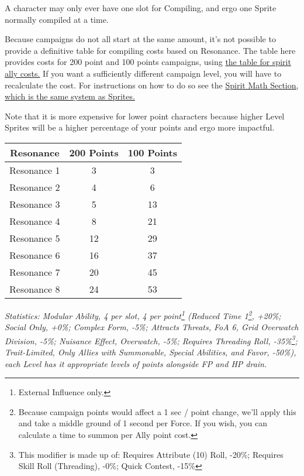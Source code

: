 \begin{multicols*}{3}
	A character may only ever have one slot for Compiling, and ergo one Sprite normally compiled at a time.
	
	Because campaigns do not all start at the same amount, it's not possible to provide a definitive table for compiling costs based on Resonance. The table here provides costs for 200 point and 100 points campaigns, using \hyperref[sprite_ally_cost]{the table for spirit ally costs.} If you want a sufficiently different campaign level, you will have to recalculate the cost. For instructions on how to do so see the \hyperref[spirit_math]{Spirit Math Section, which is the same system as Sprites.} 
	
	Note that it is more expensive for lower point characters because higher Level Sprites will be a higher percentage of your points and ergo more impactful.
	
	\begin{center}
		\begin{tabular}{|c|c|c|}
			\hline
			Resonance & 200 Points & 100 Points \\
			\hline
			\hline
			Resonance 1 & 3 & 3 \\
			Resonance 2 & 4 & 6 \\
			Resonance 3 & 5 & 13 \\
			Resonance 4 & 8 & 21 \\
			Resonance 5 & 12 & 29 \\
			Resonance 6 & 16 & 37 \\
			Resonance 7 & 20 & 45 \\
			Resonance 8 & 24 & 53 \\
			\hline
		\end{tabular}
	\end{center}	
	
	\textit{\textcolor{OliveGreen}{Statistics: Modular Ability, 4 per slot, 4 per point\footnote{External Influence only.} (Reduced Time 1\footnote{Because campaign points would affect a 1 sec / point change, we'll apply this and take a middle ground of 1 second per Force. If you wish, you can calculate a time to summon per Ally point cost.}, +20\%; Social Only, +0\%; Complex Form, -5\%; Attracts Threats, FoA 6, Grid Overwatch Division, -5\%; Nuisance Effect, Overwatch, -5\%; Requires Threading Roll, -35\%\footnote{This modifier is made up of: Requires Attribute (10) Roll, -20\%; Requires Skill Roll (Threading), -0\%; Quick Contest, -15\%}; Trait-Limited, Only Allies with Summonable, Special Abilities, and Favor, -50\%), each Level has it appropriate levels of points alongside FP and HP drain.}}


\end{multicols*}

